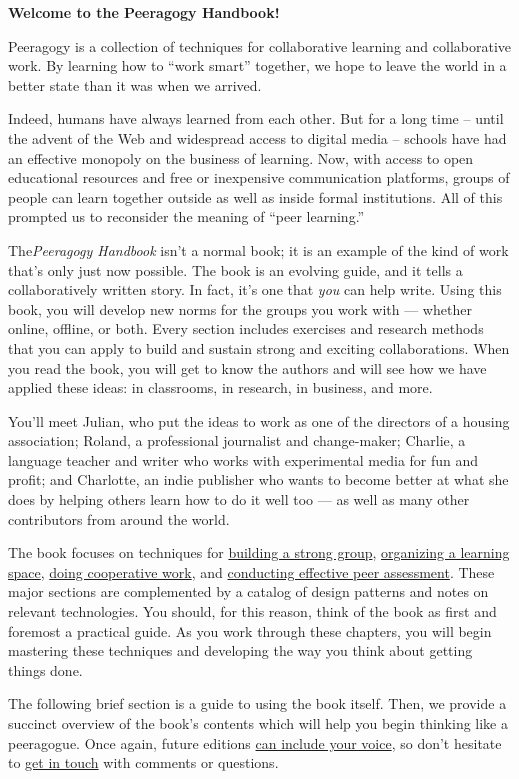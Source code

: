 \textbf{Welcome to the Peeragogy Handbook!}

Peeragogy is a collection of techniques for collaborative learning and
collaborative work. By learning how to ``work smart'' together, we hope
to leave the world in a better state than it was when we arrived.

Indeed, humans have always learned from each other. But for a long time
-- until the advent of the Web and widespread access to digital media --
schools have had an effective monopoly on the business of learning. Now,
with access to open educational resources and free or inexpensive
communication platforms, groups of people can learn together outside as
well as inside formal institutions. All of this prompted us to
reconsider the meaning of ``peer learning.''

The\emph{Peeragogy Handbook} isn't a normal book; it is an example of
the kind of work that's only just now possible. The book is an evolving
guide, and it tells a collaboratively written story. In fact, it's one
that \emph{you} can help write. Using this book, you will develop new
norms for the groups you work with --- whether online, offline, or both.
Every section includes exercises and research methods that you can apply
to build and sustain strong and exciting collaborations. When you read
the book, you will get to know the authors and will see how we have
applied these ideas: in classrooms, in research, in business, and more.

You'll meet Julian, who put the ideas to work as one of the directors of
a housing association; Roland, a professional journalist and
change-maker; Charlie, a language teacher and writer who works with
experimental media for fun and profit; and Charlotte, an indie publisher
who wants to become better at what she does by helping others learn how
to do it well too --- as well as many other contributors from around the
world.

The book focuses on techniques for
\href{http://peeragogy.org/convene/}{building a strong group},
\href{http://peeragogy.org/organize/}{organizing a learning space},
\href{http://peeragogy.org/cowork/}{doing cooperative work}, and
\href{http://peeragogy.org/assessment/}{conducting effective peer
assessment}. These major sections are complemented by a catalog of
design patterns and notes on relevant technologies. You should, for this
reason, think of the book as first and foremost a practical guide. As
you work through these chapters, you will begin mastering these
techniques and developing the way you think about getting things done.

The following brief section is a guide to using the book itself. Then,
we provide a succinct overview of the book's contents which will help
you begin thinking like a peeragogue. Once again, future editions
\href{http://peeragogy.org/resources/how-to-get-involved/}{can include
your voice}, so don't hesitate to
\href{http://peeragogy.org/contact/}{get in touch} with comments or
questions.


